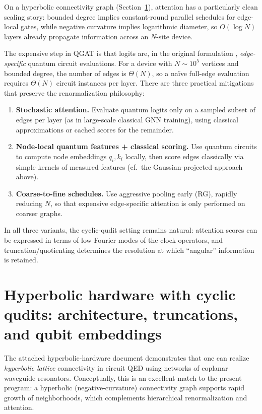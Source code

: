 \documentclass[11pt,oneside]{amsbook}
\numberwithin{equation}{section}
\theoremstyle{plain}
\theoremstyle{definition}
\theoremstyle{remark}
\begin{document}
On a hyperbolic connectivity graph (Section~\ref{sec:hyperbolic_cyclic_hardware}), attention has a particularly clean scaling story:
bounded degree implies constant-round parallel schedules for edge-local gates, while negative curvature implies logarithmic diameter, so
$O(\log N)$ layers already propagate information across an $N$-site device.

The expensive step in QGAT is that logits are, in the original formulation \cite{Ning2025QGAT}, \emph{edge-specific} quantum circuit evaluations.
For a device with $N\sim 10^5$ vertices and bounded degree, the number of edges is $\Theta(N)$, so a na\"ive full-edge evaluation requires
$\Theta(N)$ circuit instances per layer.  There are three practical mitigations that preserve the renormalization philosophy:

\begin{enumerate}
\item \textbf{Stochastic attention.} Evaluate quantum logits only on a sampled subset of edges per layer (as in large-scale classical GNN training),
using classical approximations or cached scores for the remainder.
\item \textbf{Node-local quantum features + classical scoring.} Use quantum circuits to compute node embeddings $q_i,k_i$ locally, then score edges
classically via simple kernels of measured features (cf.\ the Gaussian-projected approach above).
\item \textbf{Coarse-to-fine schedules.} Use aggressive pooling early (RG), rapidly reducing $N$, so that expensive edge-specific attention is only
performed on coarser graphs.
\end{enumerate}

In all three variants, the cyclic-qudit setting remains natural: attention scores can be expressed in terms of low Fourier modes of the clock
operators, and truncation/quotienting determines the resolution at which ``angular'' information is retained.


\section{Hyperbolic hardware with cyclic qudits: architecture, truncations, and qubit embeddings}
\label{sec:hyperbolic_cyclic_hardware}

The attached hyperbolic-hardware document \cite{Kollar2018HyperbolicHardware} demonstrates that one can realize \emph{hyperbolic lattice}
connectivity in circuit QED using networks of coplanar waveguide resonators. Conceptually, this is an
excellent match to the present program: a hyperbolic (negative-curvature) connectivity graph supports
rapid growth of neighborhoods, which complements hierarchical renormalization and attention.
\end{document}
